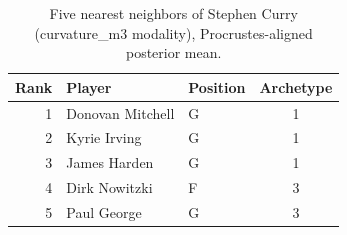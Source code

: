 \begin{table}[htbp]
  \centering\small
  \begin{tabular}{rllc}
    \toprule
    Rank & Player & Position & Archetype \\
    \midrule
    1 & Donovan Mitchell & G & 1 \\
    2 & Kyrie Irving & G & 1 \\
    3 & James Harden & G & 1 \\
    4 & Dirk Nowitzki & F & 3 \\
    5 & Paul George & G & 3 \\
    \bottomrule
  \end{tabular}
  \caption{Five nearest neighbors of Stephen Curry (curvature_m3 modality), Procrustes-aligned posterior mean.}
  \label{tab:Stephen_Curry_neighbors_curvature_m3}
\end{table}

